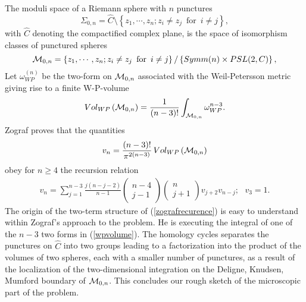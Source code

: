 \documentclass[a4paper,12pt]{article}
\begin{document}
The moduli space of a Riemann sphere with $n$ punctures 
\[
\Sigma_{0,n}=\hat{C}\setminus \left\{z_1, \cdots ,z_n; z_i 
\neq z_j \,\,\, \mbox{for} \,\,\,  i\neq j
\right\},
\]
with $\hat{C}$ denoting the compactified complex plane, is the 
space of isomorphism classes of punctured spheres 
\[
{\cal M}_{0,n}=
\left\{z_1, \cdots ,z_n; z_i \neq z_j \,\,\, \mbox{for} \,\,\,  i\neq j
\right\}/\left\{Symm(n)\times PSL(2,C)\right\},
\]
Let $\omega_{WP}^{(n)}$ be the two-form  on ${\cal M}_{0,n}$ 
associated with the Weil-Petersson metric giving rise to a finite 
W-P-volume 
\begin{equation}
Vol_{WP}\left({\cal M}_{0,n}\right)=\frac{1}{(n-3)!}\int_{{\cal M}_{0,n}}
\omega_{WP}^{n-3}.
\label{wpvolume}
\end{equation} 
Zograf proves \cite{zograf} that the quantities 
\[
v_n =\frac{(n-3)!}{\pi^{2(n-3)}} \,Vol_{WP}\left({\cal M}_{0,n}\right)
\]
obey for $n\geq 4$ the recursion relation 
\begin{eqnarray}
v_n=\sum_{j=1}^{n-3}\frac{j(n-j-2)}{n-1}
\left(
\begin{array}{c}
n-4 \\
j-1
\end{array}
\right)
\left(
\begin{array}{c}
n \\
j+1
\end{array}
\right)
v_{j+2}v_{n-j}; \, \, \, \, v_3=1.
\label{zografrecurence}
\end{eqnarray} 
The origin of the two-term structure of (\ref{zografrecurence}) 
is easy to understand within Zograf's approach to the problem. He 
is executing the integral of one of the $n-3$ two forms in 
(\ref{wpvolume}). The homology cycles separates the punctures 
on $\hat{C}$ into two groups leading 
to a factorization into the product of the volumes of two spheres, 
each with a smaller number of punctures, as a result of the 
localization of the two-dimensional integration on the Deligne, 
Knudsen, Mumford boundary \cite{deligne} of ${\cal M}_{0,n}$. 
This concludes our rough sketch of the microscopic part of the 
problem.
\end{document}
